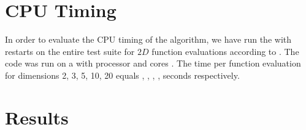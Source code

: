 \documentclass[sigconf]{acmart}
\begin{document}




\maketitle


%
%
%

\section{CPU Timing}
In order to evaluate the CPU timing of the algorithm, we have run the \change{\algorithmA} with restarts on the entire \bbobcons test suite \cite{dufosse2022constrained} for $2 D$ function evaluations according to \cite{hansen2016exp}. The  code was run on a  with  processor and  cores . The time per function evaluation for dimensions 2, 3, 5, 10, 20 equals , , , ,  seconds respectively. 


\section{Results}
\end{document}
